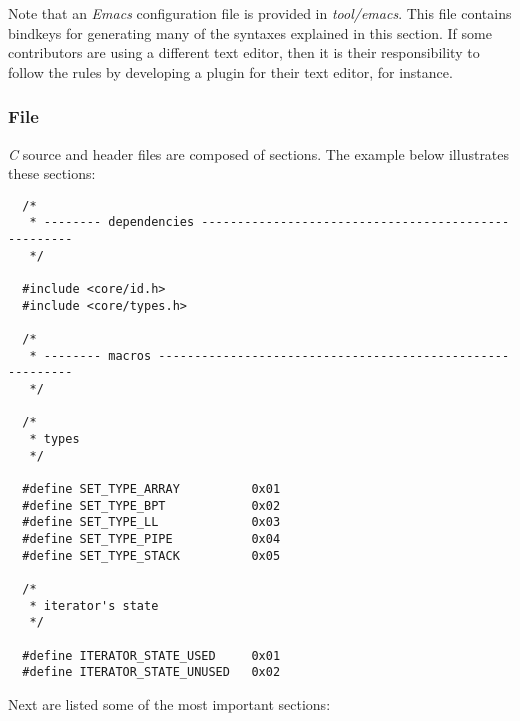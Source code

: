 Note that an \textit{Emacs} configuration file is provided in
\textit{tool/emacs}. This file contains bindkeys for generating many of
the syntaxes explained in this section. If some contributors are using
a different text editor, then it is their responsibility to follow the rules
by developing a plugin for their text editor, for instance.


\subsubsection{File}

\textit{C} source and header files are composed of sections. The example
below illustrates these sections:

\begin{verbatim}
  /*
   * -------- dependencies ----------------------------------------------------
   */

  #include <core/id.h>
  #include <core/types.h>

  /*
   * -------- macros ----------------------------------------------------------
   */

  /*
   * types
   */

  #define SET_TYPE_ARRAY          0x01
  #define SET_TYPE_BPT            0x02
  #define SET_TYPE_LL             0x03
  #define SET_TYPE_PIPE           0x04
  #define SET_TYPE_STACK          0x05

  /*
   * iterator's state
   */

  #define ITERATOR_STATE_USED     0x01
  #define ITERATOR_STATE_UNUSED   0x02
\end{verbatim}

Next are listed some of the most important sections:

